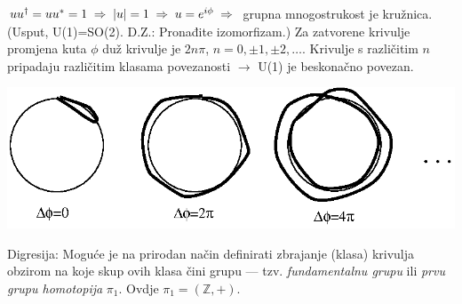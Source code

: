 \begin{primjer}[U(1)]
$u u^\dagger = u u^* = 1 \;\Rightarrow\; |u|=1 \;\Rightarrow\; u=e^{i\phi} \;\Rightarrow\;$ grupna
mnogostrukost je kružnica.
(Usput, U(1)=SO(2). D.Z.: Pronađite izomorfizam.)
Za zatvorene krivulje promjena kuta $\phi$ duž krivulje je $2n\pi$,
$n=0,\pm 1, \pm 2, \ldots$. Krivulje s različitim $n$ pripadaju
različitim klasama povezanosti $\to$ U(1) je beskonačno povezan.

\centerline{\includegraphics[scale=1.0]{pics/homotopija.eps}}

Digresija: Moguće je na prirodan način definirati zbrajanje (klasa) krivulja 
obzirom na koje skup ovih klasa čini grupu --- tzv. \emph{fundamentalnu
grupu} ili \emph{prvu grupu homotopija} $\pi_1$. Ovdje $\pi_1=(\mathbb{Z}, +)$.

\end{primjer}

